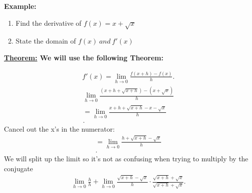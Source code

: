\documentclass{report}
\begin{document}
        \pagebreak \bigbreak \noindent
        \begin{large}
            \textbf{Example:}
        \end{large}
        \bigbreak \noindent 
        \begin{enumerate}
            \item Find the derivative of $f(x) = x + \sqrt{x}$
            \item State the domain of $f(x)\ and\ f\prime(x)$
        \end{enumerate}
        \bigbreak \noindent 
        \begin{mdframed}
            \textbf{\underline{Theorem:} We will use the following Theorem:}		
        \end{mdframed}
        \begin{align*}
            f\prime(x) = \lim\limits_{h \to 0}{ \frac{f(x+h) - f(x)}{h}}
        .\end{align*}
        \bigbreak \noindent 
        \begin{align*}
            \lim\limits_{h \to 0}{ \frac{(x + h + \sqrt{x + h}) - (x + \sqrt{x})}{h}} \\ 
            = \lim\limits_{h \to 0}{ \frac{x + h + \sqrt{x + h} - x - \sqrt{x}}{h}} \\ 
        .\end{align*}
        \bigbreak \noindent 
        Cancel out the x's in the numerator:
        \begin{align*}
            = \lim\limits_{h \to 0}{ \frac{h + \sqrt{x + h}- \sqrt{x}}{h}} \\ 
        .\end{align*}
        \bigbreak \noindent 
        We will split up the limit so it's not as confusing when trying to multiply by the conjugate
        \begin{align*}
            \lim\limits_{h \to 0}{ \frac{h}{h}} + \lim\limits_{h \to 0}{ \frac{ \sqrt{x+h} - \sqrt{x}}{h}} \cdot \frac{ \sqrt{x+h} + \sqrt{x}}{\sqrt{x+h} + \sqrt{x}}
        .\end{align*}
        \bigbreak \noindent 
\end{document}
